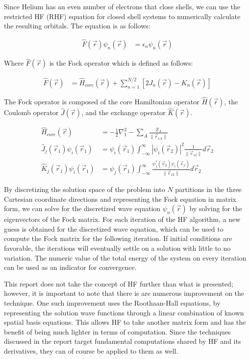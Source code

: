 \documentclass[journal, twoside]{IEEEtran}
\begin{document}
Since Helium has an even number of electrons that close shells, we can use the restricted HF (RHF) equation for closed shell systems to numerically calculate the resulting orbitals. The equation is as follows:

\begin{align}
  \hat{F}(\vec{r})\psi_n(\vec{r}) &= \epsilon_n\psi_n(\vec{r})
\end{align}

Where $\hat{F}(\vec{r})$ is the Fock operator which is defined as follows:

\begin{align}
  \hat{F}(\vec{r}) &= \hat{H}_{core}(\vec{r}) + \sum_{n=1}^{N/2}\left[2J_n(\vec{r}) - K_n(\vec{r})\right]
\end{align}

The Fock operator is composed of the core Hamiltonian operator $\hat{H}(\vec{r})$, the Coulomb operator $\hat{J}(\vec{r})$, and the exchange operator $\hat{K}(\vec{r})$.

\begin{align}
  \hat{H}_{core}(\vec{r}) &= -\frac{1}{2}\nabla_1^2 - \sum_A\frac{Z_A}{\|\vec{r}_{1 A}\|}\\
  \hat{J}_j(\vec{r}_1)\psi_i(\vec{r}_1) &= \psi_i(\vec{r}_1)\int_{-\infty}^{\infty}\left|\psi_i(\vec{r}_2)\right|^2\frac{1}{\|\vec{r}_{12}\|}d\vec{r}_2 \\
  \hat{K}_j(\vec{r}_1)\psi_i(\vec{r}_1) &= \psi_j(\vec{r}_1)\int_{-\infty}^{\infty}\frac{\psi_j^\ast(\vec{r}_2)\psi_i(\vec{r}_2)}{\|\vec{r}_{12}\|}d\vec{r}_2
\end{align}

By discretizing the solution space of the problem into $N$ partitions in the three Cartesian coordinate directions and representing the Fock equation in matrix form, we can solve for the discretized wave equation $\psi_n(\vec{r})$ by solving for the eigenvectors of the Fock matrix. For each iteration of the HF algorithm, a new guess is obtained for the discretized wave equation, which can be used to compute the Fock matrix for the following iteration. If initial conditions are favorable, the iterations will eventually settle on a solution with little to no variation. The numeric value of the total energy of the system on every iteration can be used as an indicator for convergence.

This report does not take the concept of HF further than what is presented; however, it is important to note that there is are numerous improvement on the technique. One such improvement uses the Roothaan-Hall equations, by representing the solution wave functions through a linear combination of known spatial basis equations. This allows HF to take another matrix form and has the benefit of being much lighter in terms of computation. Since the techniques discussed in the report target fundamental computations shared by HF and its derivatives, they can of course be applied to them as well.
\end{document}
